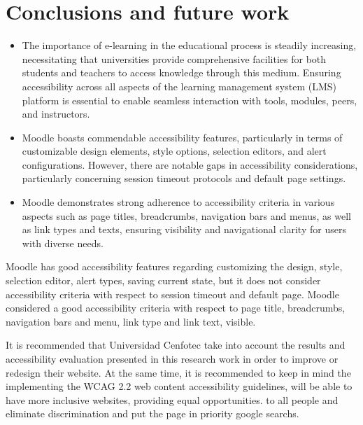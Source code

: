 \documentclass{IEEEtran}
\begin{document}
\section{Conclusions and future work}
\begin{itemize}
    \item The importance of e-learning in the educational process is steadily increasing, necessitating that universities provide comprehensive facilities for both students and teachers to access knowledge through this medium. Ensuring accessibility across all aspects of the learning management system (LMS) platform is essential to enable seamless interaction with tools, modules, peers, and instructors.
    \item Moodle boasts commendable accessibility features, particularly in terms of customizable design elements, style options, selection editors, and alert configurations. However, there are notable gaps in accessibility considerations, particularly concerning session timeout protocols and default page settings.
    \item Moodle demonstrates strong adherence to accessibility criteria in various aspects such as page titles, breadcrumbs, navigation bars and menus, as well as link types and texts, ensuring visibility and navigational clarity for users with diverse needs.
\end{itemize}
Moodle has good accessibility features regarding customizing the design, style, selection editor, alert types, saving current state, but it does not consider accessibility criteria with respect to session timeout and default page.  
Moodle considered a good accessibility criteria with respect to page title, breadcrumbs, navigation bars and menu, link type and link text, visible.

It is recommended that Universidad Cenfotec take  into account the results and accessibility evaluation presented in this research work in order to improve or redesign their website. At the same time, it is recommended to keep in mind the implementing the WCAG 2.2 web content accessibility guidelines, will be able to have more inclusive websites, providing equal opportunities. to all people and eliminate discrimination and put the page in priority google searchs.

\nocite{}



    
\end{document}

